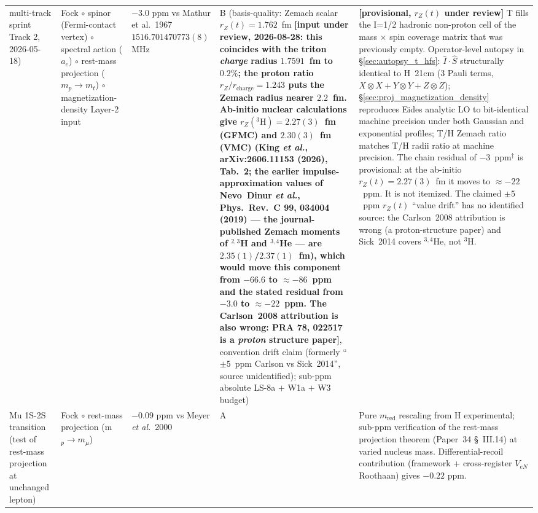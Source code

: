 \documentclass[11pt]{article}
\begin{document}
{\begin{longtable}{p{3.8cm} p{2.5cm} p{1.5cm} p{1.4cm} p{4.5cm}}
multi-track sprint Track 2, 2026-05-18) & Fock $\circ$ spinor (Fermi-contact
vertex) $\circ$ spectral action ($a_e$) $\circ$ rest-mass projection
($m_p \to m_t$) $\circ$ magnetization-density Layer-2 input
& $-3.0$ ppm vs Mathur et al.\ 1967 $1516.701470773(8)$ MHz & B
(basis-quality: Zemach scalar $r_Z(t) = 1.762$~fm \textbf{[input under
review, 2026-08-28: this coincides with the triton \emph{charge} radius
$1.7591$~fm to $0.2\%$; the proton ratio $r_Z/r_\text{charge}=1.243$ puts
the Zemach radius nearer $2.2$~fm.  Ab-initio nuclear calculations give
$r_Z({}^3\text{H}) = 2.27(3)$~fm (GFMC) and $2.30(3)$~fm (VMC)
(King \emph{et al.}, arXiv:2606.11153 (2026), Tab.~2; the earlier
impulse-approximation values of Nevo~Dinur \emph{et al.}, Phys.\ Rev.\ C
\textbf{99}, 034004 (2019) --- the journal-published Zemach moments of
$^{2,3}$H and $^{3,4}$He --- are $2.35(1)$/$2.37(1)$~fm), which
would move
this component from $-66.6$ to $\approx -86$~ppm and the stated residual
from $-3.0$ to $\approx -22$~ppm.  The Carlson~2008 attribution is also wrong: PRA 78,
022517 is a \emph{proton} structure paper]},
convention drift claim (formerly ``$\pm 5$~ppm Carlson vs Sick~2014'',
source unidentified); sub-ppm absolute
LS-8a $+$ W1a $+$ W3 budget) & \textbf{[provisional, $r_Z(t)$ under
review]}  T fills
the I=1/2 hadronic non-proton cell of the mass $\times$ spin coverage
matrix that was previously empty.  Operator-level autopsy in
\S\ref{sec:autopsy_t_hfs}: $\hat{I}\cdot\hat{S}$ structurally
identical to H~21cm (3 Pauli terms, $X{\otimes}X + Y{\otimes}Y +
Z{\otimes}Z$); \S\ref{sec:proj_magnetization_density} reproduces
Eides analytic LO to bit-identical machine precision under both
Gaussian and exponential profiles; T/H Zemach ratio matches T/H
radii ratio at machine precision.  The chain residual of
$-3$~ppm$^{\ddagger}$ is provisional: at the ab-initio
$r_Z(t) = 2.27(3)$~fm it moves to $\approx -22$~ppm.  It is not
itemized.  The claimed $\pm 5$~ppm
$r_Z(t)$ ``value drift'' has no identified source: the Carlson~2008
attribution is wrong (a proton-structure paper) and Sick~2014 covers
${}^{3,4}$He, not ${}^3$H. \\
Mu 1S-2S transition (test of rest-mass projection at unchanged lepton)
& Fock $\circ$ rest-mass projection (m$_p \to m_\mu$) & $-0.09$ ppm vs
Meyer \emph{et al.}\ 2000 & A & Pure $m_\text{red}$ rescaling from H experimental;
sub-ppm verification of the rest-mass projection theorem (Paper~34
\S~III.14) at varied nucleus mass.  Differential-recoil contribution
(framework + cross-register $V_{eN}$ Roothaan) gives $-0.22$ ppm.

\end{longtable}}
\end{document}
